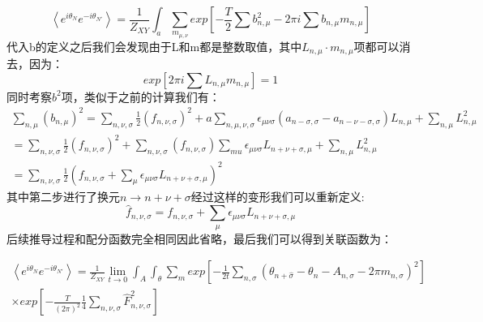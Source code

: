 \documentclass{article}
\begin{document}
\begin{equation}
    \left\langle e^{i \theta_N}e^{- i \theta_{N'}}\right\rangle  = \frac{1}{Z_{XY}} \int_a \sum_{m_{\mu,\nu}} exp \left[-\frac{T}{2} \sum b_{n,\mu}^2 - 2 \pi i \sum b_{n,\mu} m_{n,\mu} \right] 
\end{equation}
代入b的定义之后我们会发现由于L和m都是整数取值，其中$L_{n,\mu} \cdot m_{n,\mu}$项都可以消去，因为：
\begin{equation}
    exp\left[ 2 \pi i \sum L_{n,\mu} m_{n,\mu}\right] = 1
\end{equation}
同时考察$b^2$项，类似于之前的计算我们有：
\begin{equation}
    \begin{split}
        \sum_{n,\mu} \left(b_{n,\mu}\right)^2  = \sum_{n,\nu,\sigma} \frac{1}{2}\left(f_{n,\nu,\sigma}\right)^2 + a\sum_{n,\mu,\nu,\sigma} \epsilon_{\mu\nu\sigma} (a_{n-\sigma,\sigma}- a_{n-\nu-\sigma,\sigma})L_{n,\mu} + \sum_{n,\mu} L_{n,\mu}^2\\
         = \sum_{n,\nu,\sigma} \frac{1}{2}\left(f_{n,\nu,\sigma}\right)^2 +\sum_{n,\nu,\sigma} (f_{n,\nu,\sigma})\sum_{mu}\epsilon_{\mu\nu\sigma}L_{n+\nu+\sigma,\mu}+\sum_{n,\mu} L_{n,\mu}^2\\
         = \sum_{n,\nu,\sigma} \frac{1}{2}\left(f_{n,\nu,\sigma}+\sum_{\mu} \epsilon_{\mu\nu\sigma}L_{n+\nu+\sigma,\mu}\right)^2 
    \end{split}
\end{equation}
其中第二步进行了换元$n \to n+\nu+\sigma$经过这样的变形我们可以重新定义:
\begin{equation}
    \hat f_{n,\nu,\sigma} = f_{n,\nu,\sigma}+\sum_{\mu} \epsilon_{\mu\nu\sigma}L_{n+\nu+\sigma,\mu}
\end{equation}
后续推导过程和配分函数完全相同因此省略，最后我们可以得到关联函数为：

\begin{equation}
    \begin{split}
        \left\langle e^{i \theta_N}e^{- i \theta_{N'}}\right\rangle = \frac{1}{Z_{XY}} \lim_{t \to 0}  \int_{A}  \int_{\theta}\sum_{m} exp \left[-\frac{1}{2t} \sum_{n,\sigma} (\theta_{n+ \hat \sigma} - \theta_n - A_{n,\sigma} - 2 \pi m_{n,\sigma})^2 \right]  \\
     \times exp \left[- \frac{T}{\left(2 \pi\right)^2 }  \frac{1}{4} \sum_{n,\nu,\sigma} \hat F_{n,\nu,\sigma}^2 \right]  
    \end{split}
 \end{equation}
\end{document}
